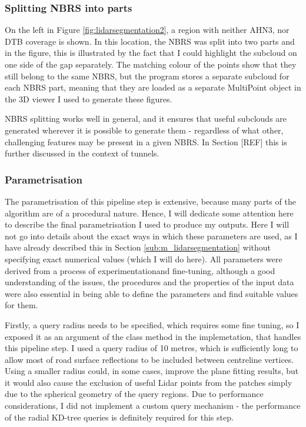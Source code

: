 \subsubsection{Splitting NBRS into parts}

On the left in Figure \ref{fig:lidarsegmentation2}, a region with neither AHN3, nor DTB coverage is shown. In this location, the NBRS was split into two parts and in the figure, this is illustrated by the fact that I could highlight the subcloud on one side of the gap separately. The matching colour of the points show that they still belong to the same NBRS, but the program stores a separate subcloud for each NBRS part, meaning that they are loaded as a separate MultiPoint object in the 3D viewer I used to generate these figures.

NBRS splitting works well in general, and it ensures that useful subclouds are generated wherever it is possible to generate them - regardless of what other, challenging features may be present in a given NBRS. In Section [REF] this is further discussed in the context of tunnels.

\subsubsection{Parametrisation}

The parametrisation of this pipeline step is extensive, because many parts of the algorithm are of a procedural nature. Hence, I will dedicate some attention here to describe the final parametrisation I used to produce my outputs. Here I will not go into details about the exact ways in which these parameters are used, as I have already described this in Section \ref{sub:m_lidarsegmentation} without specifying exact numerical values (which I will do here). All parameters were derived from a process of experimentationand fine-tuning, although a good understanding of the issues, the procedures and the properties of the input data were also essential in being able to define the parameters and find suitable values for them.

Firstly, a query radius needs to be specified, which requires some fine tuning, so I exposed it as an argument of the class method in the implemetation, that handles this pipeline step. I used a query radius of 10 metres, which is sufficiently long to allow most of road surface reflections to be included between centreline vertices. Using a smaller radius could, in some cases, improve the plane fitting results, but it would also cause the exclusion of useful Lidar points from the patches simply due to the spherical geometry of the query regions. Due to performance considerations, I did not implement a custom query mechanism - the performance of the radial KD-tree queries is definitely required for this step.

